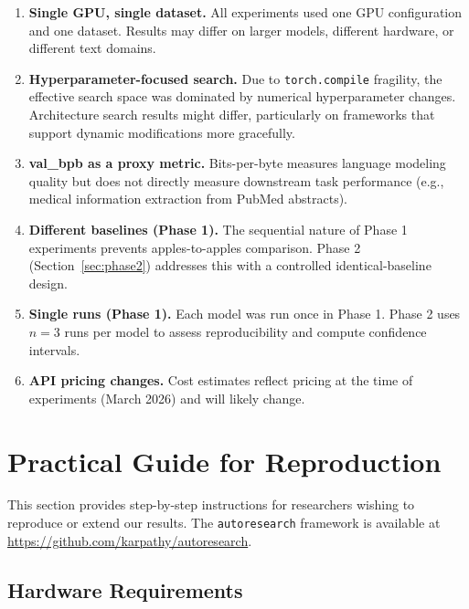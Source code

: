 \documentclass[11pt]{article}
\begin{document}
\begin{enumerate}[leftmargin=*]
    \item \textbf{Single GPU, single dataset.} All experiments used one GPU configuration and one dataset. Results may differ on larger models, different hardware, or different text domains.
    \item \textbf{Hyperparameter-focused search.} Due to \texttt{torch.compile} fragility, the effective search space was dominated by numerical hyperparameter changes. Architecture search results might differ, particularly on frameworks that support dynamic modifications more gracefully.
    \item \textbf{val\_bpb as a proxy metric.} Bits-per-byte measures language modeling quality but does not directly measure downstream task performance (e.g., medical information extraction from PubMed abstracts).
    \item \textbf{Different baselines (Phase 1).} The sequential nature of Phase 1 experiments prevents apples-to-apples comparison. Phase 2 (Section~\ref{sec:phase2}) addresses this with a controlled identical-baseline design.
    \item \textbf{Single runs (Phase 1).} Each model was run once in Phase 1. Phase 2 uses $n=3$ runs per model to assess reproducibility and compute confidence intervals.
    \item \textbf{API pricing changes.} Cost estimates reflect pricing at the time of experiments (March 2026) and will likely change.
\end{enumerate}

\section{Practical Guide for Reproduction}
\label{sec:guide}

This section provides step-by-step instructions for researchers wishing to reproduce or extend our results. The \texttt{autoresearch} framework is available at \url{https://github.com/karpathy/autoresearch}.

\subsection{Hardware Requirements}
\label{sec:hw_requirements}
\end{document}
